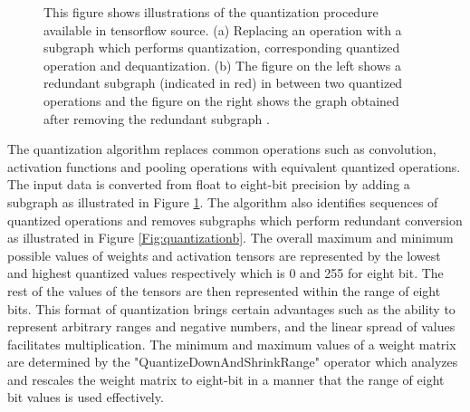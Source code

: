 \begin{figure}[h]
\begin{subfigure}{.6\textwidth}
			\caption{}
			\label{Fig:quantizationa}
		\end{subfigure}
		\caption{ This figure shows illustrations of the quantization procedure available in tensorflow source. (a) Replacing an operation with a subgraph which performs quantization, corresponding quantized operation and dequantization. (b) The figure on the left shows a redundant subgraph (indicated in red) in between two quantized operations and the figure on the right shows the graph obtained after removing the redundant subgraph \cite{quant_blog}.}
		\label{Fig:quantization}
	\end{figure}

The quantization algorithm replaces common operations such as convolution, activation functions and pooling operations with equivalent quantized operations. The input data is converted from float to eight-bit precision by adding a subgraph as illustrated in Figure \ref{Fig:quantizationa}. The algorithm also identifies sequences of quantized operations and removes subgraphs which perform redundant conversion as illustrated in Figure \ref{Fig:quantizationb}. The overall maximum and minimum possible values of weights and activation tensors are represented by the lowest and highest quantized values respectively which is 0 and 255 for eight bit. The rest of the values of the tensors are then represented within the range of eight bits. This format of quantization brings certain advantages such as the ability to represent arbitrary ranges and negative numbers, and the linear spread of values facilitates multiplication. The minimum and maximum values of a weight matrix are determined by the "QuantizeDownAndShrinkRange" operator which analyzes and rescales the weight matrix to eight-bit in a manner that the range of eight bit values is used effectively.
